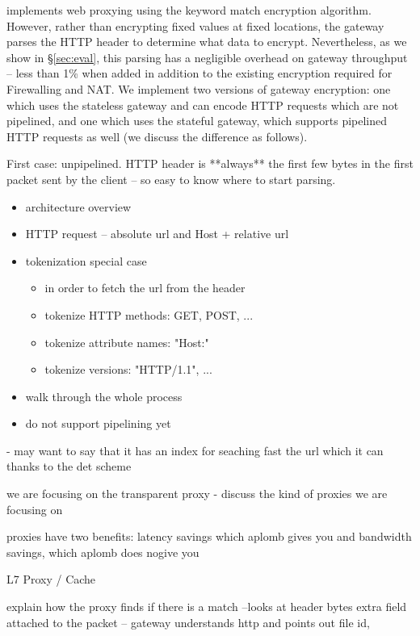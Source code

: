 \sys implements web proxying using the keyword match encryption algorithm. 
However, rather than encrypting fixed values at fixed locations, the \sys gateway parses the HTTP header to determine what data to encrypt.
Nevertheless, as we show in \S\ref{sec:eval}, this parsing has a negligible overhead on gateway throughput -- less than 1\% when added in addition to the existing encryption required for Firewalling and NAT.
We implement two versions of gateway encryption: one which uses the stateless gateway and can encode HTTP requests which are not pipelined, and one which uses the stateful gateway, which supports pipelined HTTP requests as well (we discuss the difference as follows).

First case: unpipelined. HTTP header is **always** the first few bytes in the first packet sent by the client -- so easy to know where to start parsing.
\begin{itemize}
\item architecture overview
\item HTTP request -- absolute url and Host + relative url
\item tokenization special case \\
    \begin{itemize}
    \item in order to fetch the url from the header
    \item tokenize HTTP methods: GET, POST, ...
    \item tokenize attribute names: "Host:"
    \item tokenize versions: "HTTP/1.1", ...
    \end{itemize}
\item walk through the whole process
\item do not support pipelining yet
\end{itemize}

- may want to say that it has an index for seaching fast the url which it can thanks to the det scheme


we are focusing on the transparent proxy
- discuss the kind of proxies we are focusing on

proxies have two benefits: latency savings which aplomb gives you 
and bandwidth savings, which aplomb does nogive you
 
L7 Proxy / Cache

explain how the proxy finds if there is  a match --looks at header bytes
extra field attached to the packet -- gateway understands http and points out file id, 

